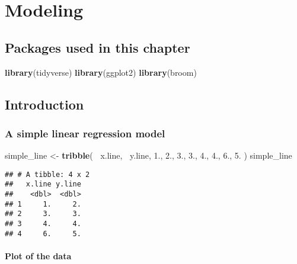 \documentclass[]{book}
\newenvironment{Shaded}{\begin{snugshade}}{\end{snugshade}}
\newcommand{\FloatTok}[1]{\textcolor[rgb]{0.00,0.00,0.81}{#1}}
\newcommand{\KeywordTok}[1]{\textcolor[rgb]{0.13,0.29,0.53}{\textbf{#1}}}
\newcommand{\NormalTok}[1]{#1}
\newcommand{\OperatorTok}[1]{\textcolor[rgb]{0.81,0.36,0.00}{\textbf{#1}}}
\newcommand{\StringTok}[1]{\textcolor[rgb]{0.31,0.60,0.02}{#1}}
\theoremstyle{definition}
\theoremstyle{definition}
\theoremstyle{definition}
\theoremstyle{remark}
\begin{document}
\hypertarget{modeling}{%
\chapter{Modeling}\label{modeling}}

\hypertarget{packages-used-in-this-chapter-1}{%
\section{Packages used in this
chapter}\label{packages-used-in-this-chapter-1}}

\begin{Shaded}
\begin{Highlighting}[]
\KeywordTok{library}\NormalTok{(tidyverse)}
\KeywordTok{library}\NormalTok{(ggplot2)}
\KeywordTok{library}\NormalTok{(broom)}
\end{Highlighting}
\end{Shaded}

\hypertarget{introduction}{%
\section{Introduction}\label{introduction}}

\hypertarget{a-simple-linear-regression-model}{%
\subsection{A simple linear regression
model}\label{a-simple-linear-regression-model}}

\begin{Shaded}
\begin{Highlighting}[]
\NormalTok{simple_line <-}\StringTok{ }\KeywordTok{tribble}\NormalTok{(}
  \OperatorTok{~}\NormalTok{x.line, }\OperatorTok{~}\NormalTok{y.line,}
  \FloatTok{1.}\NormalTok{, }\FloatTok{2.}\NormalTok{,}
  \FloatTok{3.}\NormalTok{, }\FloatTok{3.}\NormalTok{,}
  \FloatTok{4.}\NormalTok{, }\FloatTok{4.}\NormalTok{, }
  \FloatTok{6.}\NormalTok{, }\FloatTok{5.}
\NormalTok{)}
\NormalTok{simple_line}
\end{Highlighting}
\end{Shaded}

\begin{verbatim}
## # A tibble: 4 x 2
##   x.line y.line
##    <dbl>  <dbl>
## 1     1.     2.
## 2     3.     3.
## 3     4.     4.
## 4     6.     5.
\end{verbatim}

\hypertarget{plot-of-the-data}{%
\subsubsection{Plot of the data}\label{plot-of-the-data}}
\end{document}
